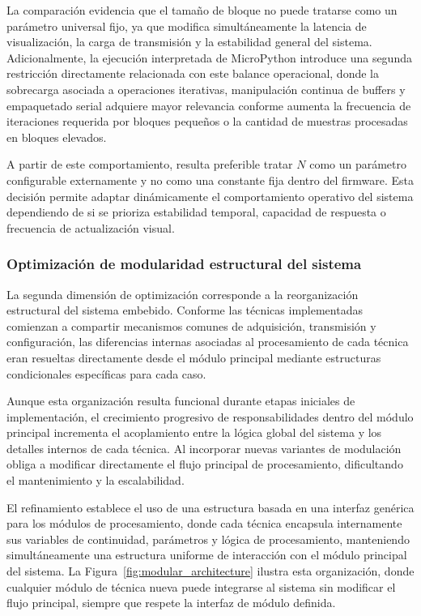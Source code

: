 La comparación evidencia que el tamaño de bloque no puede tratarse como un parámetro universal fijo, ya que modifica simultáneamente la latencia de visualización, la carga de transmisión y la estabilidad general del sistema. Adicionalmente, la ejecución interpretada de MicroPython introduce una segunda restricción directamente relacionada con este balance operacional, donde la sobrecarga asociada a operaciones iterativas, manipulación continua de buffers y empaquetado serial adquiere mayor relevancia conforme aumenta la frecuencia de iteraciones requerida por bloques pequeños o la cantidad de muestras procesadas en bloques elevados.

A partir de este comportamiento, resulta preferible tratar $N$ como un parámetro configurable externamente y no como una constante fija dentro del firmware. Esta decisión permite adaptar dinámicamente el comportamiento operativo del sistema dependiendo de si se prioriza estabilidad temporal, capacidad de respuesta o frecuencia de actualización visual.

\subsubsection{Optimización de modularidad estructural del sistema}

La segunda dimensión de optimización corresponde a la reorganización estructural del sistema embebido. Conforme las técnicas implementadas comienzan a compartir mecanismos comunes de adquisición, transmisión y configuración, las diferencias internas asociadas al procesamiento de cada técnica eran resueltas directamente desde el módulo principal mediante estructuras condicionales específicas para cada caso.

Aunque esta organización resulta funcional durante etapas iniciales de implementación, el crecimiento progresivo de responsabilidades dentro del módulo principal incrementa el acoplamiento entre la lógica global del sistema y los detalles internos de cada técnica. Al incorporar nuevas variantes de modulación obliga a modificar directamente el flujo principal de procesamiento, dificultando el mantenimiento y la escalabilidad.

El refinamiento establece el uso de una estructura basada en una interfaz genérica para los módulos de procesamiento, donde cada técnica encapsula internamente sus variables de continuidad, parámetros y lógica de procesamiento, manteniendo simultáneamente una estructura uniforme de interacción con el módulo principal del sistema. La Figura~\ref{fig:modular_architecture} ilustra esta organización, donde cualquier módulo de técnica nueva puede integrarse al sistema sin modificar el flujo principal, siempre que respete la interfaz de módulo definida.

